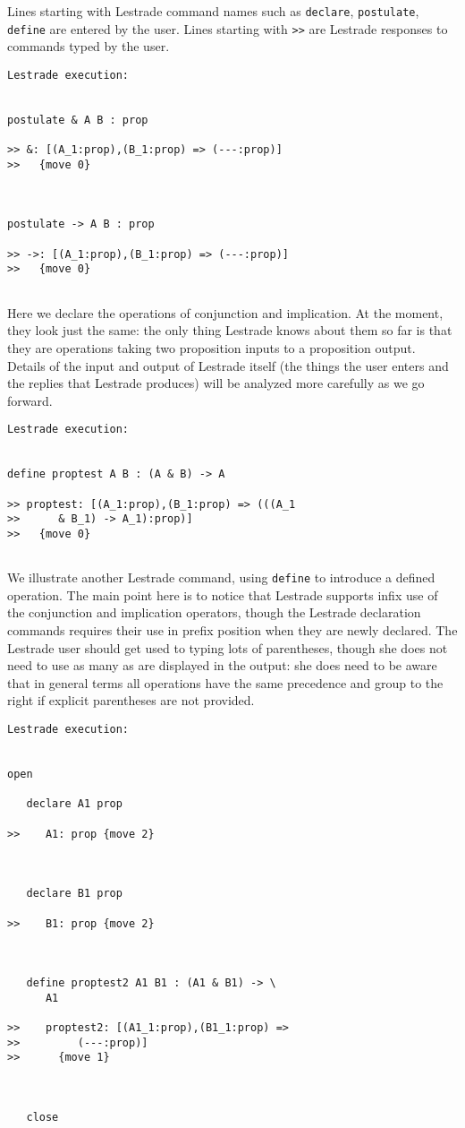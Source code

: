 \documentclass[12pt]{article}
\begin{document}
Lines starting with Lestrade command names such as {\tt declare}, {\tt postulate}, {\tt define} are entered by the user.  Lines starting with {\tt >>} are Lestrade responses to commands typed by the user.

\begin{verbatim}Lestrade execution:


postulate & A B : prop

>> &: [(A_1:prop),(B_1:prop) => (---:prop)]
>>   {move 0}



postulate -> A B : prop

>> ->: [(A_1:prop),(B_1:prop) => (---:prop)]
>>   {move 0}


\end{verbatim}

Here we declare the operations of conjunction and implication.  At the moment, they look just the same:  the only thing Lestrade knows about them so far is that they are operations taking two proposition inputs to a proposition output.  Details of the input and output of Lestrade itself (the things the user enters and the replies that Lestrade produces) will be analyzed more carefully as we go forward.

\begin{verbatim}Lestrade execution:


define proptest A B : (A & B) -> A

>> proptest: [(A_1:prop),(B_1:prop) => (((A_1
>>      & B_1) -> A_1):prop)]
>>   {move 0}


\end{verbatim}

We illustrate another Lestrade command, using {\tt define} to introduce a defined operation.  The main point here is to notice that Lestrade supports
infix use of the conjunction and implication operators, though the Lestrade declaration commands requires their use in prefix position when they are newly declared.  The Lestrade user should get used to typing lots of parentheses, though she does not need to use as many as are displayed in the output:  she does need to be aware that in general terms all operations have the same precedence and group to the right if explicit parentheses are not provided.

\begin{verbatim}Lestrade execution:


open

   declare A1 prop

>>    A1: prop {move 2}



   declare B1 prop

>>    B1: prop {move 2}



   define proptest2 A1 B1 : (A1 & B1) -> \
      A1

>>    proptest2: [(A1_1:prop),(B1_1:prop) =>
>>         (---:prop)]
>>      {move 1}



   close
\end{verbatim}
\end{document}
